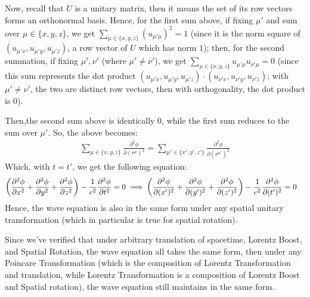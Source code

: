 \documentclass{article}
\DeclarePairedDelimiter{\paran}{(}{)}%
\begin{document}
Now, recall that $U$ is a unitary matrix, then it means the set of its row vectors forms an orthonormal basis. Hence, for the first sum above, if fixing $\mu'$ and sum over $\mu\in\{x,y,z\}$, we get $\sum_{\mu\in\{x,y,z\}}(u_{\mu'\mu})^2 = 1$ (since it is the norm square of $(u_{\mu'x},u_{\mu'y},u_{\mu'z})$, a row vector of $U$ which has norm $1$); then, for the second summation, if fixing $\mu', \nu'$ (where $\mu'\neq \nu'$), we get $\sum_{\mu\in\{x,y,z\}}u_{\mu'\mu}u_{\nu'\mu}=0$ (since this sum represents the dot product $(u_{\mu'x},u_{\mu'y},u_{\mu'z})\cdot (u_{\nu'x},u_{\nu'y},u_{\nu'z})$; with $\mu'\neq \nu'$, the two are distinct row vectors, then with orthogonality, the dot product is $0$). 

Then,the second sum above is identically $0$, while the first sum reduces to the sum over $\mu'$. So, the above becomes:
\begin{align}
    \sum_{\mu\in \{x,y,z\}}\frac{\partial^2\phi}{\partial (r^\mu)^2} = \sum_{\mu'\in\{x',y',z'\}}
\frac{\partial^2\phi}{\partial (r^{\mu'})^2}\end{align}
Which, with $t=t'$, we get the following equation:
\begin{align}
    &\paran*{\frac{\partial^2\phi}{\partial x^2}+\frac{\partial^2\phi}{\partial y^2}+\frac{\partial^2\phi}{\partial z^2}}-\frac{1}{c^2}\frac{\partial^2\phi}{\partial t^2} = 0 \implies \paran*{\frac{\partial^2\phi}{\partial(x')^2}+\frac{\partial^2\phi}{\partial (y')^2}+\frac{\partial^2\phi}{\partial (z')^2}}-\frac{1}{c^2}\frac{\partial^2\phi}{\partial (t')^2} = 0
\end{align}
Hence, the wave equation is also in the same form under any spatial unitary transformation (which in particular is true for spatial rotation).

\hfil

Since we've verified that under arbitrary translation of spacetime, Lorentz Boost, and Spatial Rotation, the wave equation all takes the same form, then under any Poincare Transformation (which is the composition of Lorentz Transformation and translation, while Lorentz Transformation is a composition of Lorentz Boost and Spatial rotation), the wave equation still maintains in the same form.
\end{document}
